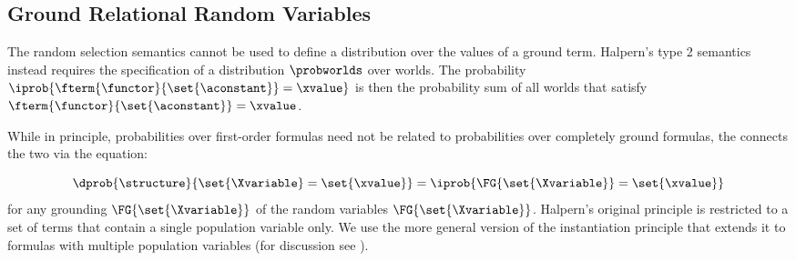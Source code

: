 \documentclass{article}
\begin{document}
%




\subsection{Ground Relational Random Variables}

The random selection semantics cannot be used to define a distribution over the values of a ground term. Halpern's type 2 semantics instead requires the specification of a distribution $\probworlds$ over worlds. The probability 
$\iprob{\fterm{\functor}{\set{\aconstant}}=\xvalue}$ is then the probability sum of all worlds that satisfy $\fterm{\functor}{\set{\aconstant}}=\xvalue$. 
%

While in principle, probabilities over first-order formulas need not be related to probabilities over completely ground formulas, the  connects the two via the equation:

\begin{equation} \label{eq:multiple-instantiate}
\dprob{\structure}{\set{\Xvariable} = \set{\xvalue}} = 
\iprob{
	{\FG{\set{\Xvariable}}}
	=
	\set{\xvalue}
}
\end{equation}
for any grounding $\FG{\set{\Xvariable}}$ of the random variables $\FG{\set{\Xvariable}}$. Halpern's original principle is restricted to a set of terms that contain a single population variable only. 
%
We use the more general version of the instantiation principle that extends it to formulas with multiple population variables (for discussion see \cite{Chiang2012}).
\end{document}
